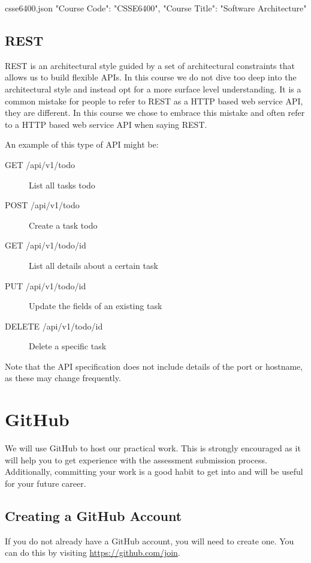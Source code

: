 \documentclass{csse4400}
\begin{document}
\begin{code}[language=json]{csse6400.json}
{
    "Course Code": "CSSE6400",
    "Course Title": "Software Architecture"
}
\end{code}

\subsection{REST}
REST is an architectural style guided by a set of architectural constraints that allows us to build flexible APIs.
In this course we do not dive too deep into the architectural style and instead opt for a more surface level understanding.
It is a common mistake for people to refer to REST as a HTTP based web service API,
they are different.
In this course we chose to embrace this mistake and often refer to a HTTP based web service API when saying REST.

\noindent An example of this type of API might be:
\begin{description}
  \item[GET /api/v1/todo] List all tasks todo
  \item[POST /api/v1/todo] Create a task todo
  \item[GET /api/v1/todo/{id}] List all details about a certain task
  \item[PUT /api/v1/todo/{id}] Update the fields of an existing task
  \item[DELETE /api/v1/todo/{id}] Delete a specific task
\end{description}
Note that the API specification does not include details of the port or hostname, as these may change frequently.

\section{GitHub}

We will use GitHub to host our practical work.
This is strongly encouraged as it will help you to get experience with the assessment submission process.
Additionally, committing your work is a good habit to get into and will be useful for your future career.

\subsection{Creating a GitHub Account}
If you do not already have a GitHub account, you will need to create one.
You can do this by visiting \url{https://github.com/join}.
\end{document}
